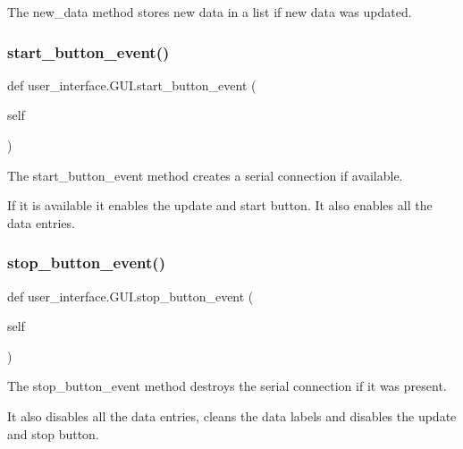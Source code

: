 The new\+\_\+data method stores new data in a list if new data was updated. 

\mbox{\label{classuser__interface_1_1GUI_a6c36b846f6241589929517ea0d7f0ecf}} 
\subsubsection{\texorpdfstring{start\+\_\+button\+\_\+event()}{start\_button\_event()}}
{\footnotesize\ttfamily def user\+\_\+interface.\+G\+U\+I.\+start\+\_\+button\+\_\+event (\begin{DoxyParamCaption}\item[{}]{self }\end{DoxyParamCaption})}



The start\+\_\+button\+\_\+event method creates a serial connection if available. 

If it is available it enables the update and start button. It also enables all the data entries. \mbox{\label{classuser__interface_1_1GUI_a6cafdec7e2cc0ca9a25429bdc44fd96e}} 
\subsubsection{\texorpdfstring{stop\+\_\+button\+\_\+event()}{stop\_button\_event()}}
{\footnotesize\ttfamily def user\+\_\+interface.\+G\+U\+I.\+stop\+\_\+button\+\_\+event (\begin{DoxyParamCaption}\item[{}]{self }\end{DoxyParamCaption})}



The stop\+\_\+button\+\_\+event method destroys the serial connection if it was present. 

It also disables all the data entries, cleans the data labels and disables the update and stop button. \mbox{\label{classuser__interface_1_1GUI_a944eaec52425551da4af2534fb43d721}} 
